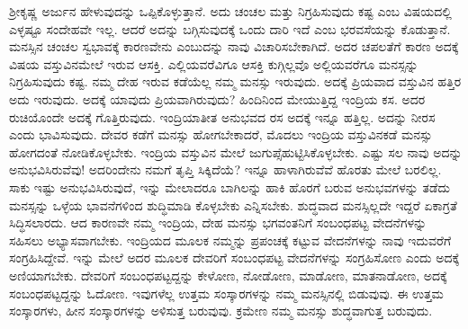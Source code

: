 ಶ‍್ರೀಕೃಷ್ಣ ಅರ್ಜುನ ಹೇಳುವುದನ್ನು ಒಪ್ಪಿಕೊಳ್ಳುತ್ತಾನೆ. ಅದು ಚಂಚಲ ಮತ್ತು ನಿಗ್ರಹಿಸುವುದು ಕಷ್ಟ ಎಂಬ ವಿಷಯದಲ್ಲಿ ಎಳ್ಳಷ್ಟೂ ಸಂದೇಹವೇ ಇಲ್ಲ. ಆದರೆ ಅದನ್ನು ಬಗ್ಗಿಸುವುದಕ್ಕೆ ಒಂದು ದಾರಿ ಇದೆ ಎಂಬ ಭರವಸೆಯನ್ನು ಕೊಡುತ್ತಾನೆ. ಮನಸ್ಸಿನ ಚಂಚಲ ಸ್ವಭಾವಕ್ಕೆ ಕಾರಣವೇನು ಎಂಬುದನ್ನು ನಾವು ವಿಚಾರಿಸಬೇಕಾಗಿದೆ. ಅದರ ಚಪಲತೆಗೆ ಕಾರಣ ಅದಕ್ಕೆ ವಿಷಯ ವಸ್ತುವಿನಮೇಲೆ ಇರುವ ಆಸಕ್ತಿ. ಎಲ್ಲಿಯವರೆವಿಗೂ ಆಸಕ್ತಿ ಕುಗ್ಗಿಲ್ಲವೊ ಅಲ್ಲಿಯವರೆಗೂ ಮನಸ್ಸನ್ನು ನಿಗ್ರಹಿಸುವುದು ಕಷ್ಟ. ನಮ್ಮ ದೇಹ ಇರುವ ಕಡೆಯೆಲ್ಲ ನಮ್ಮ ಮನಸ್ಸು ಇರುವುದು. ಅದಕ್ಕೆ ಪ್ರಿಯವಾದ ವಸ್ತುವಿನ ಹತ್ತಿರ ಅದು ಇರುವುದು. ಅದಕ್ಕೆ ಯಾವುದು ಪ್ರಿಯವಾಗಿರುವುದು? ಹಿಂದಿನಿಂದ ಮೇಯುತ್ತಿದ್ದ ಇಂದ್ರಿಯ ಕಸ. ಅದರ ರುಚಿಯೊಂದೇ ಅದಕ್ಕೆ ಗೊತ್ತಿರುವುದು. ಇಂದ್ರಿಯಾತೀತ ಅನುಭವದ ರಸ ಅದಕ್ಕೆ ಇನ್ನೂ ಹತ್ತಿಲ್ಲ. ಅದನ್ನು ನೀರಸ ಎಂದು ಭಾವಿಸುವುದು. ದೇವರ ಕಡೆಗೆ ಮನಸ್ಸು ಹೋಗಬೇಕಾದರೆ, ಮೊದಲು ಇಂದ್ರಿಯ ವಸ್ತುವಿನ\break ಕಡೆ ಮನಸ್ಸು ಹೋಗದಂತೆ ನೋಡಿಕೊಳ್ಳಬೇಕು. ಇಂದ್ರಿಯ ವಸ್ತುವಿನ ಮೇಲೆ ಜುಗುಪ್ಸೆ\break ಹುಟ್ಟಿಸಿಕೊಳ್ಳಬೇಕು. ಎಷ್ಟು ಸಲ ನಾವು ಅದನ್ನು ಅನುಭವಿಸಿರುವೆವು! ಅದರಿಂದೇನು ನಮಗೆ ತೃಪ್ತಿ ಸಿಕ್ಕಿದೆಯೆ? ಇನ್ನೂ ಹಾಳಾಗಿರುವೆವೆ ಹೊರತು ಮೇಲೆ ಬರಲಿಲ್ಲ. ಸಾಕು ಇಷ್ಟು ಅನುಭವಿ\-ಸಿರುವುದೆ, ಇನ್ನು ಮೇಲಾದರೂ ಬಾಗಿಲನ್ನು ಹಾಕಿ ಹೊರಗೆ ಬರುವ ಅನುಭವಗಳನ್ನು ತಡೆದು ಮನಸ್ಸನ್ನು ಒಳ್ಳೆಯ ಭಾವನೆಗಳಿಂದ ಶುದ್ಧಿಮಾಡಿ ಕೊಳ್ಳಬೇಕು ಎನ್ನಿಸಬೇಕು. ಶುದ್ಧವಾದ ಮನಸ್ಸಿಲ್ಲದೇ ಇದ್ದರೆ ಏಕಾಗ್ರತೆ ಸಿದ್ಧಿಸಲಾರದು. ಆದ ಕಾರಣವೇ ನಮ್ಮ ಇಂದ್ರಿಯ, ದೇಹ ಮನಸ್ಸು ಭಗವಂತನಿಗೆ ಸಂಬಂಧಪಟ್ಟ ವೇದನೆಗಳನ್ನು ಸಹಿಸಲು ಅಭ್ಯಾಸವಾಗಬೇಕು. ಇಂದ್ರಿಯದ ಮೂಲಕ ನಮ್ಮನ್ನು ಪ್ರಪಂಚಕ್ಕೆ ಕಟ್ಟುವ ವೇದನೆಗಳನ್ನು ನಾವು ಇದುವರೆಗೆ ಸಂಗ್ರಹಿ\-ಸಿದ್ದೇವೆ. ಇನ್ನು ಮೇಲೆ ಅದರ ಮೂಲಕ ದೇವರಿಗೆ ಸಂಬಂಧಪಟ್ಟ ವೇದನೆಗಳನ್ನು ಸಂಗ್ರಹಿಸೋಣ ಎಂದು ಅದಕ್ಕೆ ಅಣಿಯಾಗಬೇಕು. ದೇವರಿಗೆ ಸಂಬಂಧಪಟ್ಟದ್ದನ್ನು ಕೇಳೋಣ, ನೋಡೋಣ, ಮಾಡೋಣ, ಮಾತನಾಡೋಣ, ಅದಕ್ಕೆ ಸಂಬಂಧಪಟ್ಟದ್ದನ್ನು ಓದೋಣ. ಇವುಗಳೆಲ್ಲ ಉತ್ತಮ ಸಂಸ್ಕಾರಗಳನ್ನು ನಮ್ಮ ಮನಸ್ಸಿನಲ್ಲಿ ಬಿಡುವುವು. ಈ ಉತ್ತಮ ಸಂಸ್ಕಾರಗಳು, ಹೀನ ಸಂಸ್ಕಾರಗಳನ್ನು ಅಳಿಸುತ್ತ ಬರುವುವು. ಕ್ರಮೇಣ ನಮ್ಮ ಮನಸ್ಸು ಶುದ್ಧವಾಗುತ್ತ ಬರುವುದು.

